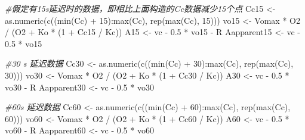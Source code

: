 \documentclass[
]{krantz}
\makeatletter
\newenvironment{Shaded}{\begin{snugshade}}{\end{snugshade}}
\newcommand{\CommentTok}[1]{\textcolor[rgb]{0.56,0.35,0.01}{\textit{#1}}}
\newcommand{\DecValTok}[1]{\textcolor[rgb]{0.00,0.00,0.81}{#1}}
\newcommand{\FloatTok}[1]{\textcolor[rgb]{0.00,0.00,0.81}{#1}}
\newcommand{\FunctionTok}[1]{\textcolor[rgb]{0.00,0.00,0.00}{#1}}
\newcommand{\NormalTok}[1]{#1}
\newcommand{\OtherTok}[1]{\textcolor[rgb]{0.56,0.35,0.01}{#1}}
\newcommand{\SpecialCharTok}[1]{\textcolor[rgb]{0.00,0.00,0.00}{#1}}
\newenvironment{kframe}{%
\medskip{}
\setlength{\fboxsep}{.8em}
 \def\at@end@of@kframe{}%
 \ifinner\ifhmode%
  \def\at@end@of@kframe{\end{minipage}}%
  \begin{minipage}{\columnwidth}%
 \fi\fi%
 \def\FrameCommand##1{\hskip\@totalleftmargin \hskip-\fboxsep
 \colorbox{shadecolor}{##1}\hskip-\fboxsep
     \hskip-\linewidth \hskip-\@totalleftmargin \hskip\columnwidth}%
 \MakeFramed {\advance\hsize-\width
   \@totalleftmargin\z@ \linewidth\hsize
   \@setminipage}}%
 {\par\unskip\endMakeFramed%
 \at@end@of@kframe}
\renewenvironment{Shaded}{\begin{kframe}}{\end{kframe}}
\makeatother
\begin{document}
\begin{Shaded}
\begin{Highlighting}[]
\CommentTok{\#假定有15s延迟时的数据，即相比上面构造的Cc数据减少15个点}
\NormalTok{Cc15 }\OtherTok{\textless{}{-}} \FunctionTok{as.numeric}\NormalTok{(}\FunctionTok{c}\NormalTok{((}\FunctionTok{min}\NormalTok{(Cc) }\SpecialCharTok{+} \DecValTok{15}\NormalTok{)}\SpecialCharTok{:}\FunctionTok{max}\NormalTok{(Cc), }\FunctionTok{rep}\NormalTok{(}\FunctionTok{max}\NormalTok{(Cc), }\DecValTok{15}\NormalTok{)))}
\NormalTok{vo15 }\OtherTok{\textless{}{-}}\NormalTok{ Vomax }\SpecialCharTok{*}\NormalTok{ O2 }\SpecialCharTok{/}\NormalTok{ (O2 }\SpecialCharTok{+}\NormalTok{ Ko }\SpecialCharTok{*}\NormalTok{ (}\DecValTok{1} \SpecialCharTok{+}\NormalTok{ Cc15 }\SpecialCharTok{/}\NormalTok{ Kc))}
\NormalTok{A15 }\OtherTok{\textless{}{-}}\NormalTok{ vc }\SpecialCharTok{{-}} \FloatTok{0.5} \SpecialCharTok{*}\NormalTok{ vo15 }\SpecialCharTok{{-}}\NormalTok{ R}
\NormalTok{Aapparent15 }\OtherTok{\textless{}{-}}\NormalTok{ vc }\SpecialCharTok{{-}} \FloatTok{0.5} \SpecialCharTok{*}\NormalTok{ vo15}

\CommentTok{\#30 s 延迟数据}
\NormalTok{Cc30 }\OtherTok{\textless{}{-}} \FunctionTok{as.numeric}\NormalTok{(}\FunctionTok{c}\NormalTok{((}\FunctionTok{min}\NormalTok{(Cc) }\SpecialCharTok{+} \DecValTok{30}\NormalTok{)}\SpecialCharTok{:}\FunctionTok{max}\NormalTok{(Cc), }\FunctionTok{rep}\NormalTok{(}\FunctionTok{max}\NormalTok{(Cc), }\DecValTok{30}\NormalTok{)))}
\NormalTok{vo30 }\OtherTok{\textless{}{-}}\NormalTok{ Vomax }\SpecialCharTok{*}\NormalTok{ O2 }\SpecialCharTok{/}\NormalTok{ (O2 }\SpecialCharTok{+}\NormalTok{ Ko }\SpecialCharTok{*}\NormalTok{ (}\DecValTok{1} \SpecialCharTok{+}\NormalTok{ Cc30 }\SpecialCharTok{/}\NormalTok{ Kc))}
\NormalTok{A30 }\OtherTok{\textless{}{-}}\NormalTok{ vc }\SpecialCharTok{{-}} \FloatTok{0.5} \SpecialCharTok{*}\NormalTok{ vo30 }\SpecialCharTok{{-}}\NormalTok{ R}
\NormalTok{Aapparent30 }\OtherTok{\textless{}{-}}\NormalTok{ vc }\SpecialCharTok{{-}} \FloatTok{0.5} \SpecialCharTok{*}\NormalTok{ vo30}

\CommentTok{\#60s 延迟数据}
\NormalTok{Cc60 }\OtherTok{\textless{}{-}} \FunctionTok{as.numeric}\NormalTok{(}\FunctionTok{c}\NormalTok{((}\FunctionTok{min}\NormalTok{(Cc) }\SpecialCharTok{+} \DecValTok{60}\NormalTok{)}\SpecialCharTok{:}\FunctionTok{max}\NormalTok{(Cc), }\FunctionTok{rep}\NormalTok{(}\FunctionTok{max}\NormalTok{(Cc), }\DecValTok{60}\NormalTok{)))}
\NormalTok{vo60 }\OtherTok{\textless{}{-}}\NormalTok{ Vomax }\SpecialCharTok{*}\NormalTok{ O2 }\SpecialCharTok{/}\NormalTok{ (O2 }\SpecialCharTok{+}\NormalTok{ Ko }\SpecialCharTok{*}\NormalTok{ (}\DecValTok{1} \SpecialCharTok{+}\NormalTok{ Cc60 }\SpecialCharTok{/}\NormalTok{ Kc))}
\NormalTok{A60 }\OtherTok{\textless{}{-}}\NormalTok{ vc }\SpecialCharTok{{-}} \FloatTok{0.5} \SpecialCharTok{*}\NormalTok{ vo60 }\SpecialCharTok{{-}}\NormalTok{ R}
\NormalTok{Aapparent60 }\OtherTok{\textless{}{-}}\NormalTok{ vc }\SpecialCharTok{{-}} \FloatTok{0.5} \SpecialCharTok{*}\NormalTok{ vo60}


\end{Highlighting}
\end{Shaded}
\end{document}
